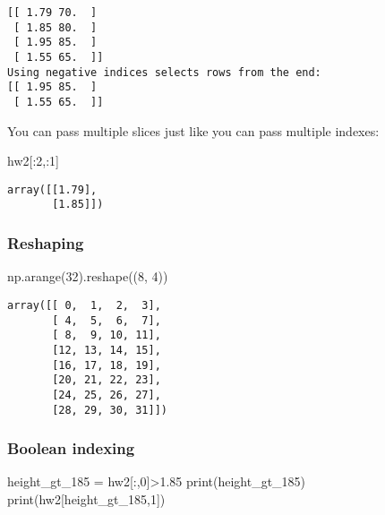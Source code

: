 \documentclass[
  letterpaper,
  DIV=11,
  numbers=noendperiod]{scrreprt}
\newenvironment{Shaded}{\begin{snugshade}}{\end{snugshade}}
\newcommand{\BuiltInTok}[1]{\textcolor[rgb]{0.00,0.23,0.31}{#1}}
\newcommand{\DecValTok}[1]{\textcolor[rgb]{0.68,0.00,0.00}{#1}}
\newcommand{\FloatTok}[1]{\textcolor[rgb]{0.68,0.00,0.00}{#1}}
\newcommand{\NormalTok}[1]{\textcolor[rgb]{0.00,0.23,0.31}{#1}}
\newcommand{\OperatorTok}[1]{\textcolor[rgb]{0.37,0.37,0.37}{#1}}
\begin{document}
\begin{verbatim}
[[ 1.79 70.  ]
 [ 1.85 80.  ]
 [ 1.95 85.  ]
 [ 1.55 65.  ]]
Using negative indices selects rows from the end:
[[ 1.95 85.  ]
 [ 1.55 65.  ]]
\end{verbatim}

You can pass multiple slices just like you can pass multiple indexes:

\begin{Shaded}
\begin{Highlighting}[]
\NormalTok{hw2[:}\DecValTok{2}\NormalTok{,:}\DecValTok{1}\NormalTok{]}
\end{Highlighting}
\end{Shaded}

\begin{verbatim}
array([[1.79],
       [1.85]])
\end{verbatim}

\hypertarget{reshaping}{%
\subsubsection{Reshaping}\label{reshaping}}

\begin{Shaded}
\begin{Highlighting}[]
\NormalTok{np.arange(}\DecValTok{32}\NormalTok{).reshape((}\DecValTok{8}\NormalTok{, }\DecValTok{4}\NormalTok{))}
\end{Highlighting}
\end{Shaded}

\begin{verbatim}
array([[ 0,  1,  2,  3],
       [ 4,  5,  6,  7],
       [ 8,  9, 10, 11],
       [12, 13, 14, 15],
       [16, 17, 18, 19],
       [20, 21, 22, 23],
       [24, 25, 26, 27],
       [28, 29, 30, 31]])
\end{verbatim}

\hypertarget{boolean-indexing}{%
\subsubsection{Boolean indexing}\label{boolean-indexing}}

\begin{Shaded}
\begin{Highlighting}[]
\NormalTok{height\_gt\_185 }\OperatorTok{=}\NormalTok{ hw2[:,}\DecValTok{0}\NormalTok{]}\OperatorTok{\textgreater{}}\FloatTok{1.85}
\BuiltInTok{print}\NormalTok{(height\_gt\_185)}
\BuiltInTok{print}\NormalTok{(hw2[height\_gt\_185,}\DecValTok{1}\NormalTok{])}
\end{Highlighting}
\end{Shaded}
\end{document}
